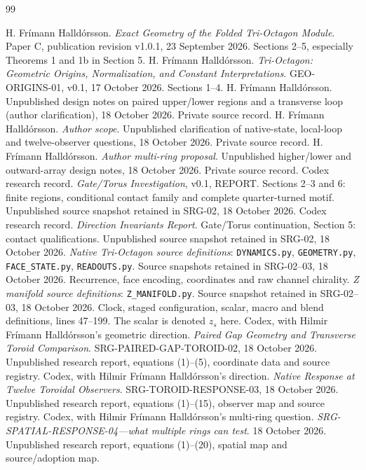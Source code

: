 \begin{thebibliography}{99}\raggedright
{} H. Fr\'imann Halld\'orsson. \emph{Exact Geometry of the Folded Tri-Octagon Module}. Paper C, publication revision v1.0.1, 23 September 2026. Sections 2--5, especially Theorems 1 and 1b in Section 5.
 H. Fr\'imann Halld\'orsson. \emph{Tri-Octagon: Geometric Origins, Normalization, and Constant Interpretations}. GEO-ORIGINS-01, v0.1, 17 October 2026. Sections 1--4.
 H. Fr\'imann Halld\'orsson. Unpublished design notes on paired upper/lower regions and a transverse loop (author clarification), 18 October 2026. Private source record.
 H. Fr\'imann Halld\'orsson. \emph{Author scope}. Unpublished clarification of native-state, local-loop and twelve-observer questions, 18 October 2026. Private source record.
 H. Fr\'imann Halld\'orsson. \emph{Author multi-ring proposal}. Unpublished higher/lower and outward-array design notes, 18 October 2026. Private source record.
 Codex research record. \emph{Gate/Torus Investigation}, v0.1, REPORT. Sections 2--3 and 6: finite regions, conditional contact family and complete quarter-turned motif. Unpublished source snapshot retained in SRG-02, 18 October 2026.
 Codex research record. \emph{Direction Invariants Report}. Gate/Torus continuation, Section 5: contact qualifications. Unpublished source snapshot retained in SRG-02, 18 October 2026.
 \emph{Native Tri-Octagon source definitions}: \texttt{DYNAMICS.py}, \texttt{GEOMETRY.py}, \texttt{FACE\_STATE.py}, \texttt{READOUTS.py}. Source snapshots retained in SRG-02--03, 18 October 2026. Recurrence, face encoding, coordinates and raw channel chirality.
 \emph{Z manifold source definitions}: \texttt{Z\_MANIFOLD.py}. Source snapshot retained in SRG-02--03, 18 October 2026. Clock, staged configuration, scalar, macro and blend definitions, lines 47--199. The scalar is denoted $z_s$ here.
 Codex, with Hilmir Fr\'imann Halld\'orsson's geometric direction. \emph{Paired Gap Geometry and Transverse Toroid Comparison}. SRG-PAIRED-GAP-TOROID-02, 18 October 2026. Unpublished research report, equations (1)--(5), coordinate data and source registry.
 Codex, with Hilmir Fr\'imann Halld\'orsson's direction. \emph{Native Response at Twelve Toroidal Observers}. SRG-TOROID-RESPONSE-03, 18 October 2026. Unpublished research report, equations (1)--(15), observer map and source registry.
 Codex, with Hilmir Fr\'imann Halld\'orsson's multi-ring question. \emph{SRG-SPATIAL-RESPONSE-04---what multiple rings can test}. 18 October 2026. Unpublished research report, equations (1)--(20), spatial map and source/adoption map.

\end{thebibliography}
